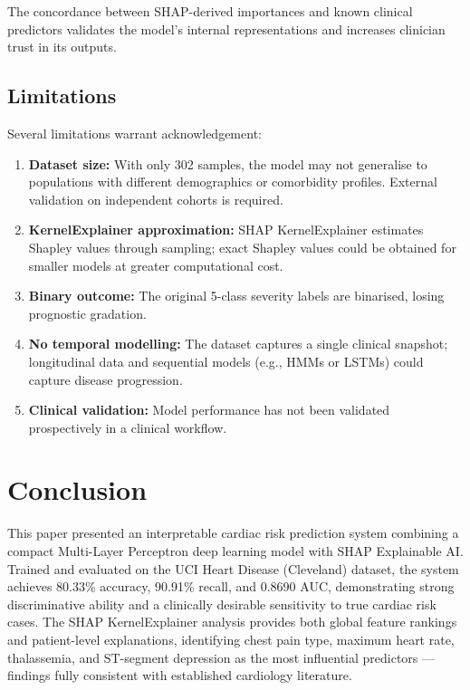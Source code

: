 \documentclass[conference]{IEEEtran}
\begin{document}
The concordance between SHAP-derived importances and known clinical predictors validates the model's internal representations and increases clinician trust in its outputs.

\subsection{Limitations}

Several limitations warrant acknowledgement:

\begin{enumerate}
    \item \textbf{Dataset size:} With only 302 samples, the model may not generalise to populations with different demographics or comorbidity profiles. External validation on independent cohorts is required.
    \item \textbf{KernelExplainer approximation:} SHAP KernelExplainer estimates Shapley values through sampling; exact Shapley values could be obtained for smaller models at greater computational cost.
    \item \textbf{Binary outcome:} The original 5-class severity labels are binarised, losing prognostic gradation.
    \item \textbf{No temporal modelling:} The dataset captures a single clinical snapshot; longitudinal data and sequential models (e.g., HMMs or LSTMs) could capture disease progression.
    \item \textbf{Clinical validation:} Model performance has not been validated prospectively in a clinical workflow.
\end{enumerate}

\section{Conclusion}
\label{sec:conclusion}

This paper presented an interpretable cardiac risk prediction system combining a compact Multi-Layer Perceptron deep learning model with SHAP Explainable AI. Trained and evaluated on the UCI Heart Disease (Cleveland) dataset, the system achieves 80.33\% accuracy, 90.91\% recall, and 0.8690 AUC, demonstrating strong discriminative ability and a clinically desirable sensitivity to true cardiac risk cases. The SHAP KernelExplainer analysis provides both global feature rankings and patient-level explanations, identifying chest pain type, maximum heart rate, thalassemia, and ST-segment depression as the most influential predictors — findings fully consistent with established cardiology literature.
\end{document}
